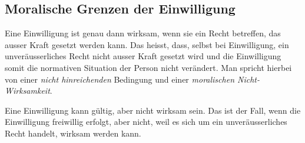 \documentclass[../main.tex]{subfiles}
\begin{document}
\subsection{Moralische Grenzen der Einwilligung}
Eine Einwilligung ist genau dann wirksam, wenn sie ein Recht betreffen, das ausser Kraft gesetzt werden kann. Das heisst, dass, selbst bei Einwilligung, ein unveräusserliches Recht nicht ausser Kraft gesetzt wird und die Einwilligung somit die normativen Situation der Person nicht verändert. Man spricht hierbei von einer \textit{nicht hinreichenden} Bedingung und einer \textit{moralischen Nicht-Wirksamkeit}. 

Eine Einwilligung kann gültig, aber nicht wirksam sein. Das ist der Fall, wenn die Einwilligung freiwillig erfolgt, aber nicht, weil es sich um ein unveräusserliches Recht handelt, wirksam werden kann. 
\end{document}
